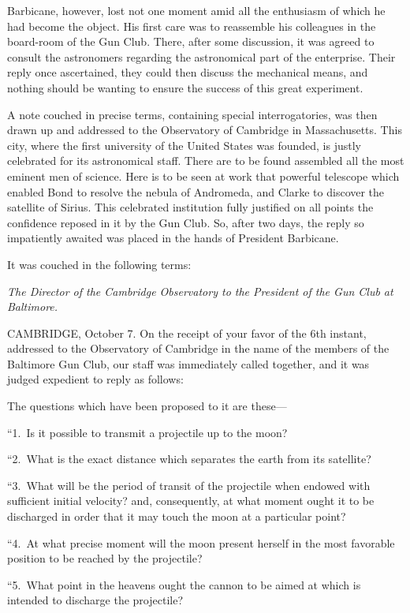 \documentclass[a4paper]{article}
\begin{document}
Barbicane, however, lost not one moment amid all the enthusiasm of which he
had become the object. His first care was to reassemble his colleagues in the
board-room of the Gun Club. There, after some discussion, it was agreed to
consult the astronomers regarding the astronomical part of the enterprise.
Their reply once ascertained, they could then discuss the mechanical means, and
nothing should be wanting to ensure the success of this great experiment.

A note couched in precise terms, containing special interrogatories, was then
drawn up and addressed to the Observatory of Cambridge in Massachusetts. This
city, where the first university of the United States was founded, is justly
celebrated for its astronomical staff. There are to be found assembled all the
most eminent men of science. Here is to be seen at work that powerful telescope
which enabled Bond to resolve the nebula of Andromeda, and Clarke to discover
the satellite of Sirius. This celebrated institution fully justified on all
points the confidence reposed in it by the Gun Club. So, after two days, the
reply so impatiently awaited was placed in the hands of President Barbicane.

It was couched in the following terms:

\emph{The Director of the Cambridge Observatory to the President of the Gun Club at Baltimore.}

CAMBRIDGE, October 7. On the receipt of your favor of the 6th instant,
addressed to the Observatory of Cambridge in the name of the members of the
Baltimore Gun Club, our staff was immediately called together, and it was
judged expedient to reply as follows:

The questions which have been proposed to it are these---

``1.~Is it possible to transmit a projectile up to the moon?

``2.~What is the exact distance which separates the earth from its satellite?

``3.~What will be the period of transit of the projectile when endowed with
sufficient initial velocity? and, consequently, at what moment ought it to be
discharged in order that it may touch the moon at a particular point?

``4.~At what precise moment will the moon present herself in the most favorable
position to be reached by the projectile?

``5.~What point in the heavens ought the cannon to be aimed at which is
intended to discharge the projectile?
\end{document}
